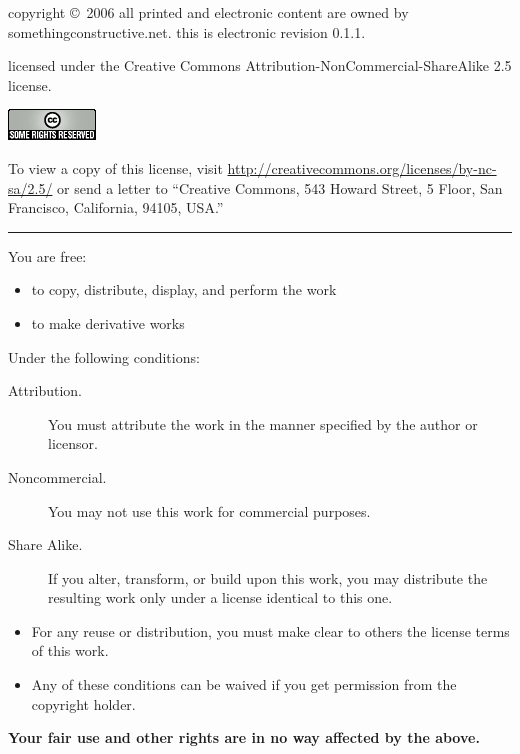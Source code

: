 \begin{center}

  copyright \copyright\ 2006 all printed and electronic content are
  owned by somethingconstructive.net.  this is electronic revision 0.1.1.

  \bigskip

  licensed under the Creative Commons
  Attribution-\-NonCommercial-\-ShareAlike 2.5 license.

  \medskip

  \includegraphics{cc.png}

  \medskip

  To view a copy of this license, visit
  \href{http://creativecommons.org/licenses/by-nc-sa/2.5/}{http://creativecommons.org/licenses/by-nc-sa/2.5/}
  or send a letter to ``Creative Commons, 543 Howard Street,
  5 Floor, San Francisco, California, 94105, USA.''

\rule{4cm}{1pt}

\end{center}

\noindent You are free:

\begin{itemize}
  \item to copy, distribute, display, and perform the work
  \item to make derivative works
\end{itemize}

\noindent Under the following conditions:

\begin{description}

  \item[Attribution.] You must attribute the work in the manner
  specified by the author or licensor.

  \item[Noncommercial.] You may not use this work for commercial purposes.

  \item[Share Alike.] If you alter, transform, or build upon this
  work, you may distribute the resulting work only under a license
  identical to this one.

\end{description}

\begin{itemize}

    \item For any reuse or distribution, you must make clear to others
    the license terms of this work.

    \item Any of these conditions can be waived if you get permission
    from the copyright holder.

\end{itemize}

\noindent\textbf{Your fair use and other rights are in no way affected
by the above.}

\clearpage
